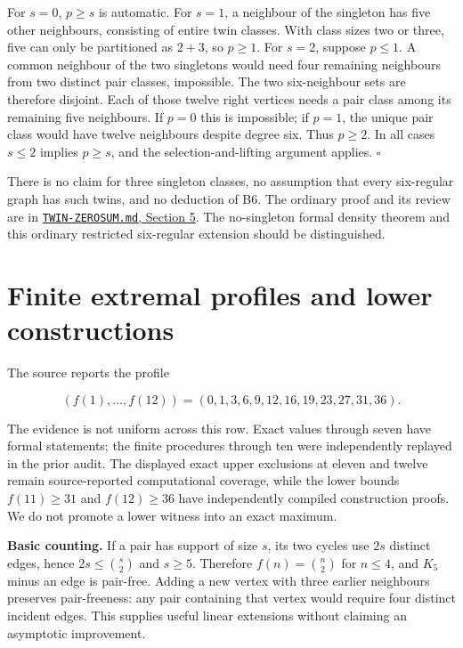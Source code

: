 \documentclass[smallextended]{svjour3}
\begin{document}
For \(s=0\), \(p\ge s\) is automatic. For \(s=1\), a neighbour of the
singleton has five other neighbours, consisting of entire twin classes.
With class sizes two or three, five can only be partitioned as \(2+3\),
so \(p\ge1\). For \(s=2\), suppose \(p\le1\). A common neighbour of the
two singletons would need four remaining neighbours from two distinct
pair classes, impossible. The two six-neighbour sets are therefore
disjoint. Each of those twelve right vertices needs a pair class among
its remaining five neighbours. If \(p=0\) this is impossible; if
\(p=1\), the unique pair class would have twelve neighbours despite
degree six. Thus \(p\ge2\). In all cases \(s\le2\) implies \(p\ge s\),
and the selection-and-lifting argument applies. \(\square\)

There is no claim for three singleton classes, no assumption that every
six-regular graph has such twins, and no deduction of B6. The ordinary
proof and its review are in
\href{https://github.com/roberthuynh/erdos-585/blob/1efc324e155ef0b6a7081c5f695c6c825e7debef/findings/supplement/papers/twin-core/TWIN-ZEROSUM.md}{\texttt{TWIN-ZEROSUM.md},
Section 5}. The no-singleton formal density theorem and this ordinary
restricted six-regular extension should be distinguished.

\section{Finite extremal profiles and lower
constructions}\label{finite-extremal-profiles-and-lower-constructions}

The source reports the profile

\[
(f(1),\ldots,f(12))=(0,1,3,6,9,12,16,19,23,27,31,36).
\]

The evidence is not uniform across this row. Exact values through seven
have formal statements; the finite procedures through ten were
independently replayed in the prior audit. The displayed exact upper
exclusions at eleven and twelve remain source-reported computational
coverage, while the lower bounds \(f(11)\geq31\) and \(f(12)\geq36\)
have independently compiled construction proofs. We do not promote a
lower witness into an exact maximum.

\textbf{Basic counting.} If a pair has support of size \(s\), its two
cycles use \(2s\) distinct edges, hence \(2s\leq\binom{s}{2}\) and
\(s\geq5\). Therefore \(f(n)=\binom n2\) for \(n\leq4\), and \(K_5\)
minus an edge is pair-free. Adding a new vertex with three earlier
neighbours preserves pair-freeness: any pair containing that vertex
would require four distinct incident edges. This supplies useful linear
extensions without claiming an asymptotic improvement.
\end{document}
